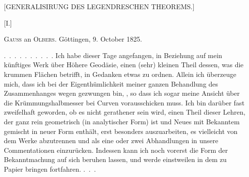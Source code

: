 \clearpage
{}
\begin{center}\large [GENERALISIRUNG DES LEGENDRESCHEN THEOREMS.]\end{center}
\begin{center}[I.]\end{center}
\begin{center}\textsc{Gauss} an \textsc{Olbers}. Göttingen, 9. October 1825.\end{center}
\indent\mbox{. . . . . . . . . .} Ich habe dieser Tage angefangen, in Beziehung auf mein künftiges Werk über Höhere Geodäsie, einen (sehr) kleinen Theil dessen, was die krummen Flächen betrifft, in Gedanken etwas zu ordnen. Allein ich überzeuge mich, dass ich bei der Eigenthümlichkeit meiner ganzen Behandlung des Zusammenhanges wegen gezwungen bin, , so dass ich sogar meine Ansicht über die Krümmungshalbmesser bei  Curven vorausschicken muss. Ich bin darüber fast zweifelhaft geworden, ob es nicht gerathener sein wird, einen Theil dieser Lehren, der ganz rein geometrisch (in analytischer Form) ist und Neues mit Bekanntem gemischt in neuer Form enthält, erst besonders auszuarbeiten, es vielleicht von dem Werke abzutrennen und als eine oder zwei Abhandlungen in unsere Commentationen einzurücken. Indessen kann ich noch vorerst die Form der Bekanntmachung auf sich beruhen lassen, und werde einstweilen in dem zu Papier bringen fortfahren. \mbox{. . .}
